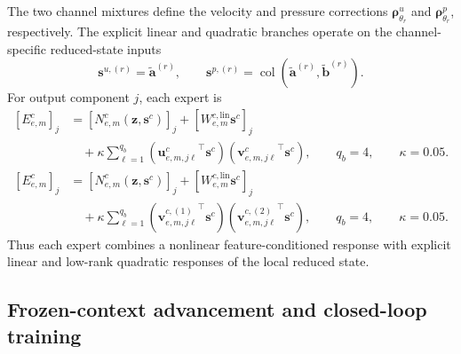 \documentclass{article}
\providecommand{\DIFaddend}{} %
\DeclareRobustCommand{\DIFaddend}{\DIFOaddend \let\includegraphics\DIFOincludegraphics} %
\begin{document}
\DIFaddend The two channel mixtures define the velocity and pressure corrections
$\bm\rho_{\theta_r}^u$ and $\bm\rho_{\theta_r}^p$, respectively. The explicit linear and quadratic branches operate on the channel-specific reduced-state inputs
\begin{equation}
  \bm s^{u,(r)}
  =
  \widetilde{\bm a}^{(r)},
  \qquad
  \bm s^{p,(r)}
  =
  \operatorname{col}
  \left(
    \widetilde{\bm a}^{(r)},
    \widetilde{\bm b}^{(r)}
  \right).
  \label{eq:app_expert_state_slices}
\end{equation}
For output component $j$, each expert is
{\color{red}
\begin{align*}
  \left[E_{e,m}^c\right]_j
  &=
  \left[
    N_{e,m}^c
    \left(
      \bm z,\bm s^c
    \right)
  \right]_j
  +
  \left[
    W_{e,m}^{c,\mathrm{lin}}
    \bm s^c
  \right]_j
  \nonumber\\
  &\quad+
  \kappa
  \sum_{\ell=1}^{q_b}
  \left(
    {\bm u_{e,m,j\ell}^c}^{\top}
    \bm s^c
  \right)
  \left(
    {\bm v_{e,m,j\ell}^c}^{\top}
    \bm s^c
  \right),
  \qquad
  q_b=4,
  \qquad
  \kappa=0.05.
\end{align*}
}
{\color{blue}
\begin{align}
  \left[E_{e,m}^c\right]_j
  &=
  \left[
    N_{e,m}^c
    \left(
      \bm z,\bm s^c
    \right)
  \right]_j
  +
  \left[
    W_{e,m}^{c,\mathrm{lin}}
    \bm s^c
  \right]_j
  \nonumber\\
  &\quad+
  \kappa
  \sum_{\ell=1}^{q_b}
  \left(
    {\bm v_{e,m,j\ell}^{c,(1)}}^{\top}
    \bm s^c
  \right)
  \left(
    {\bm v_{e,m,j\ell}^{c,(2)}}^{\top}
    \bm s^c
  \right),
  \qquad
  q_b=4,
  \qquad
  \kappa=0.05.
  \label{eq:app_structured_expert}
\end{align}
}
Thus each expert combines a nonlinear feature-conditioned response with
explicit linear and low-rank quadratic responses of the local reduced state.


\subsection{Frozen-context advancement and closed-loop training}
\end{document}
